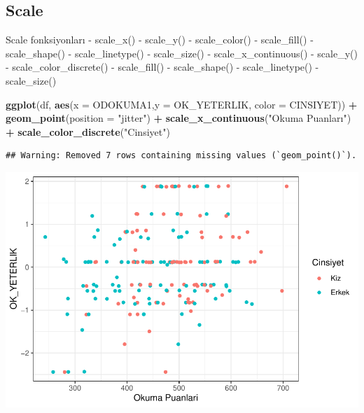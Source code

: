 \documentclass[
  oneside]{book}
\newenvironment{Shaded}{\begin{snugshade}}{\end{snugshade}}
\newcommand{\AttributeTok}[1]{\textcolor[rgb]{0.13,0.29,0.53}{#1}}
\newcommand{\FunctionTok}[1]{\textcolor[rgb]{0.13,0.29,0.53}{\textbf{#1}}}
\newcommand{\NormalTok}[1]{#1}
\newcommand{\SpecialCharTok}[1]{\textcolor[rgb]{0.81,0.36,0.00}{\textbf{#1}}}
\newcommand{\StringTok}[1]{\textcolor[rgb]{0.31,0.60,0.02}{#1}}
\begin{document}
\hypertarget{scale}{%
\subsection{Scale}\label{scale}}

Scale fonksiyonları
- scale\_x()
- scale\_y()
- scale\_color()
- scale\_fill()
- scale\_shape()
- scale\_linetype()
- scale\_size()
- scale\_x\_continuous()
- scale\_y()
- scale\_color\_discrete()
- scale\_fill()
- scale\_shape()
- scale\_linetype()
- scale\_size()

\begin{Shaded}
\begin{Highlighting}[]
\FunctionTok{ggplot}\NormalTok{(df, }\FunctionTok{aes}\NormalTok{(}\AttributeTok{x =}\NormalTok{ ODOKUMA1,}\AttributeTok{y =}\NormalTok{ OK\_YETERLIK, }\AttributeTok{color =}\NormalTok{ CINSIYET)) }\SpecialCharTok{+}
\FunctionTok{geom\_point}\NormalTok{(}\AttributeTok{position =} \StringTok{"jitter"}\NormalTok{) }\SpecialCharTok{+}
\FunctionTok{scale\_x\_continuous}\NormalTok{(}\StringTok{"Okuma Puanları"}\NormalTok{) }\SpecialCharTok{+}
\FunctionTok{scale\_color\_discrete}\NormalTok{(}\StringTok{"Cinsiyet"}\NormalTok{)}
\end{Highlighting}
\end{Shaded}

\begin{verbatim}
## Warning: Removed 7 rows containing missing values (`geom_point()`).
\end{verbatim}

\begin{center}\includegraphics[width=1\linewidth]{15-betimleyici-istatistik_files/figure-latex/unnamed-chunk-51-1} \end{center}
\end{document}
